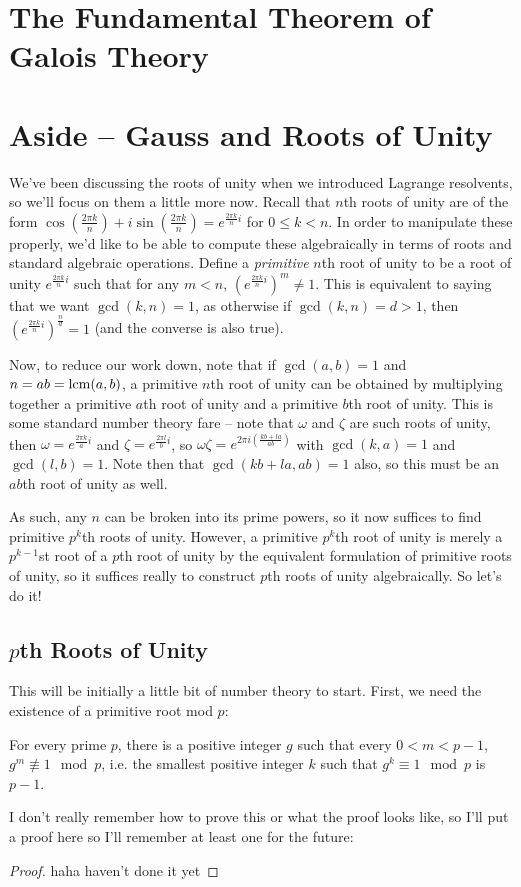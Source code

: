 \documentclass[12pt]{scrartcl}
\begin{document}
\section{The Fundamental Theorem of Galois Theory}

\section{Aside -- Gauss and Roots of Unity}
We've been discussing the roots of unity when we introduced Lagrange resolvents, so we'll focus on them a little more now. Recall that $n$th roots of unity are of the form $\cos\left(\frac{2\pi k} n \right) + i \sin \left( \frac{2\pi k} n \right) = e^{\frac{2\pi k}n i}$ for $0 \leq k < n$. In order to manipulate these properly, we'd like to be able to compute these algebraically in terms of roots and standard algebraic operations. Define a \textit{primitive} $n$th root of unity to be a root of unity $e^{\frac{2\pi k}n i}$ such that for any $m < n$, $(e^{\frac{2\pi k}n i})^m \neq 1$. This is equivalent to saying that we want $\gcd(k, n) = 1$, as otherwise if $\gcd(k, n) = d > 1$, then $(e^{\frac{2\pi k}n i})^{\frac n d} = 1$ (and the converse is also true). 

Now, to reduce our work down, note that if $\gcd(a, b) = 1$ and $n = ab = \operatorname*{lcm}(a, b)$, a primitive $n$th root of unity can be obtained by multiplying together a primitive $a$th root of unity and a primitive $b$th root of unity. This is some standard number theory fare -- note that $\omega$ and $\zeta$ are such roots of unity, then $\omega = e^{\frac{2\pi k}a i}$ and $\zeta = e^{\frac{2\pi l}b i}$, so $\omega \zeta = e^{2\pi i (\frac {kb + la}{ab})}$ with $\gcd(k, a) = 1$ and $\gcd(l, b) = 1$. Note then that $\gcd(kb + la, ab) = 1$ also, so this must be an $ab$th root of unity as well. 

As such, any $n$ can be broken into its prime powers, so it now suffices to find primitive $p^k$th roots of unity. However, a primitive $p^k$th root of unity is merely a $p^{k-1}$st root of a $p$th root of unity by the equivalent formulation of primitive roots of unity, so it suffices really to construct $p$th roots of unity algebraically. So let's do it!  

\subsection{$p$th Roots of Unity}
This will be initially a little bit of number theory to start. First, we need the existence of a primitive root mod $p$: 
\begin{lemma}
For every prime $p$, there is a positive integer $g$ such that every $0 < m < p-1$, $g^m \not\equiv 1 \mod p$, i.e. the smallest positive integer $k$ such that $g^k \equiv 1 \mod p$ is $p-1$. 
\end{lemma}
I don't really remember how to prove this or what the proof looks like, so I'll put a proof here so I'll remember at least one for the future: 
\begin{proof}
haha haven't done it yet
\end{proof}
\end{document}

